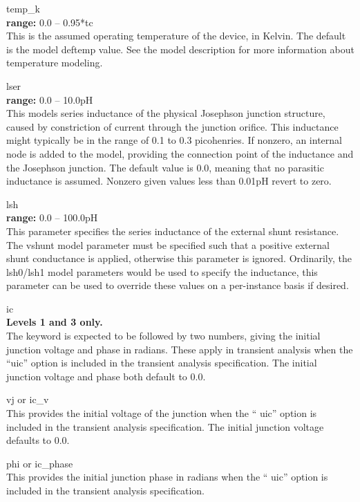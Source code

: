 \begin{description}
\item{\vt temp\_k}\\
{\bf range:} 0.0 -- 0.95*{\vt tc}\\
This is the assumed operating temperature of the device, in Kelvin. 
The default is the model {\vt deftemp} value.  See the model description
for more information about temperature modeling.

\item{\vt lser}\\
{\bf range:} 0.0 -- 10.0pH\\
This models series inductance of the physical Josephson junction
structure, caused by constriction of current through the junction
orifice.  This inductance might typically be in the range of 0.1 to
0.3 picohenries.  If nonzero, an internal node is added to the model,
providing the connection point of the inductance and the Josephson
junction.  The default value is 0.0, meaning that no parasitic
inductance is assumed.  Nonzero given values less than 0.01pH revert
to zero.

\item{\vt lsh}\\
{\bf range:} 0.0 -- 100.0pH\\
This parameter specifies the series inductance of the external shunt
resistance.  The {\vt vshunt} model parameter must be specified such
that a positive external shunt conductance is applied, otherwise this
parameter is ignored.  Ordinarily, the {\vt lsh0}/{\vt lsh1} model
parameters would be used to specify the inductance, this parameter can
be used to override these values on a per-instance basis if desired.

\item{\vt ic}\\
{\bf Levels 1 and 3 only.}\\
The keyword is expected to be followed by two numbers, giving the
initial junction voltage and phase in radians.  These apply in
transient analysis when the ``{\vt uic}'' option is included in the
transient analysis specification.  The initial junction voltage and
phase both default to 0.0.

\item{{\vt vj} or {\vt ic\_v}}\\
This provides the initial voltage of the junction when the ``{\vt
uic}'' option is included in the transient analysis specification. 
The initial junction voltage defaults to 0.0.

\item{{\vt phi} or {\vt ic\_phase}}\\
This provides the initial junction phase in radians when the ``{\vt
uic}'' option is included in the transient analysis specification.


\end{description}
